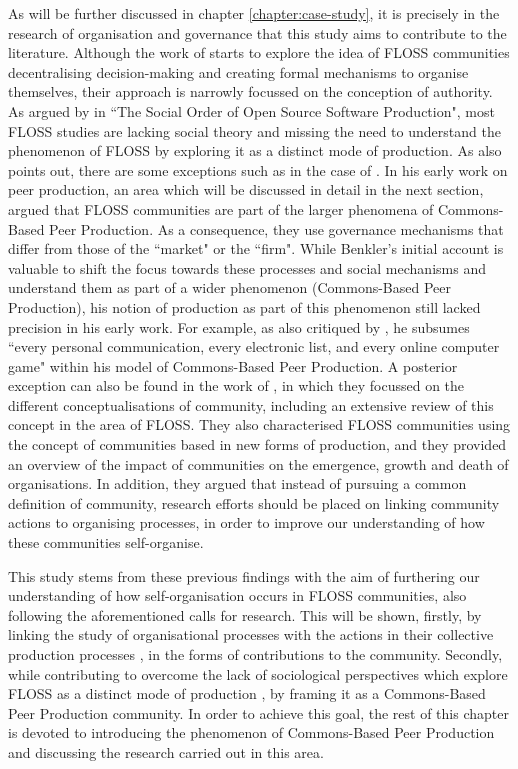 As will be further discussed in chapter \ref{chapter:case-study}, it is precisely in the research of organisation and governance that this study aims to contribute to the literature. Although the work of \textcite{o2007emergence} starts to explore the idea of FLOSS communities decentralising decision-making and creating formal mechanisms to organise themselves, their approach is narrowly focussed on the conception of authority. As argued by \textcite{glaser2007social} in ``The Social Order of Open Source Software Production", most FLOSS studies are lacking social theory and missing the need to understand the phenomenon of FLOSS by exploring it as a distinct mode of production. As \textcite{glaser2007social} also points out, there are some exceptions such as in the case of \textcite{Benkler2002}. In his early work on peer production, an area which will be discussed in detail in the next section, \textcite{Benkler2002} argued that FLOSS communities are part of the larger phenomena of Commons-Based Peer Production. As a consequence, they use governance mechanisms that differ from those of the ``market" or the ``firm". While Benkler's initial account is valuable to shift the focus towards these processes and social mechanisms and understand them as part of a wider phenomenon (Commons-Based Peer Production), his notion of production as part of this phenomenon still lacked precision in his early work. For example, as also critiqued by \textcite[169-170]{glaser2007social}, he subsumes  ``every personal communication, every electronic list, and every online computer game" within his model of Commons-Based Peer Production. A posterior exception can also be found in the work of \textcite{Mahony2011}, in which they focussed on the different conceptualisations of community, including an extensive review of this concept in the area of FLOSS. They also characterised FLOSS communities using the concept of communities based in new forms of production, and they provided an overview of the impact of communities on the emergence, growth and death of organisations. In addition, they argued that instead of pursuing a common definition of community, research efforts should be placed on linking community actions to organising processes, in order to improve our understanding of how these communities self-organise.
 
This study stems from these previous findings with the aim of furthering our understanding of  how self-organisation occurs in FLOSS communities, also following the aforementioned calls for research. This will be shown, firstly, by linking the study of organisational processes with the actions in their collective production processes \parencite{Mahony2011}, in the forms of contributions to the community. Secondly, while contributing to overcome the lack of sociological perspectives which explore FLOSS as a distinct mode of production \parencite{glaser2007social}, by framing it as a Commons-Based Peer Production community. In order to achieve this goal, the rest of this chapter is devoted to introducing the phenomenon of Commons-Based Peer Production and discussing the research carried out in this area.


